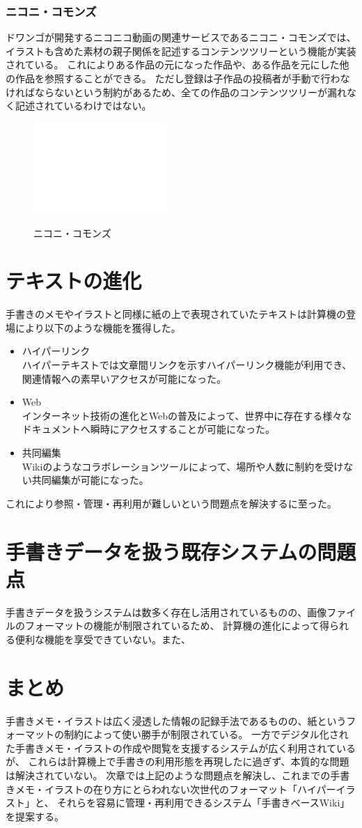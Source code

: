 \subsubsection{ニコニ・コモンズ}

ドワンゴが開発するニコニコ動画の関連サービスであるニコニ・コモンズでは、イラストも含めた素材の親子関係を記述するコンテンツツリーという機能が実装されている。
これによりある作品の元になった作品や、ある作品を元にした他の作品を参照することができる。
ただし登録は子作品の投稿者が手動で行わなければならないという制約があるため、全ての作品のコンテンツツリーが漏れなく記述されているわけではない。

\begin{figure}[htbp]
    \begin{center}
    {\includegraphics[width=50mm]{images/testimage.png}} \end{center}
    \caption{ニコニ・コモンズ}
\end{figure}


\section{テキストの進化}
手書きのメモやイラストと同様に紙の上で表現されていたテキストは計算機の登場により以下のような機能を獲得した。
\begin{itemize}
    \item ハイパーリンク\\
    ハイパーテキストでは文章間リンクを示すハイパーリンク機能が利用でき、関連情報への素早いアクセスが可能になった。
    \item Web\\
    インターネット技術の進化とWebの普及によって、世界中に存在する様々なドキュメントへ瞬時にアクセスすることが可能になった。
    \item 共同編集\\
    Wikiのようなコラボレーションツールによって、場所や人数に制約を受けない共同編集が可能になった。
\end{itemize}
これにより参照・管理・再利用が難しいという問題点を解決するに至った。

\section{手書きデータを扱う既存システムの問題点}
手書きデータを扱うシステムは数多く存在し活用されているものの、画像ファイルのフォーマットの機能が制限されているため、
計算機の進化によって得られる便利な機能を享受できていない。また、

\section{まとめ}
手書きメモ・イラストは広く浸透した情報の記録手法であるものの、紙というフォーマットの制約によって使い勝手が制限されている。
一方でデジタル化された手書きメモ・イラストの作成や閲覧を支援するシステムが広く利用されているが、
これらは計算機上で手書きの利用形態を再現したに過ぎず、本質的な問題は解決されていない。
次章では上記のような問題点を解決し、これまでの手書きメモ・イラストの在り方にとらわれない次世代のフォーマット「ハイパーイラスト」と、
それらを容易に管理・再利用できるシステム「手書きベースWiki」を提案する。